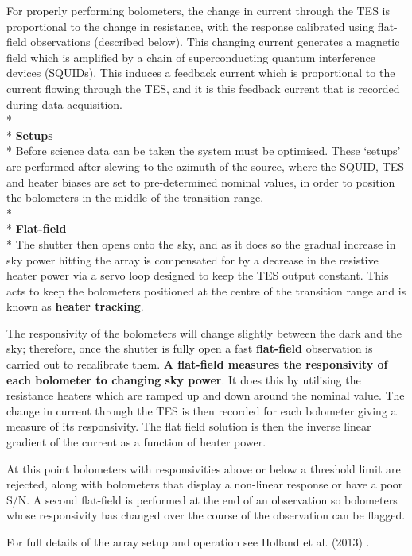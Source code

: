 \documentclass[twoside,11pt]{article}
\renewcommand{\_}{\texttt{\symbol{95}}}
\begin{document}
For properly performing bolometers, the change in current through the
TES is proportional to the change in resistance, with the response
calibrated using flat-field observations (described below). This
changing current generates a magnetic field which is amplified by a
chain of superconducting quantum interference devices (SQUIDs). This
induces a feedback current which is proportional to the current
flowing through the TES, and it is this feedback current that is
recorded during data acquisition.
\\*\\*
\textbf{Setups}\\*
Before science data can be taken the system must be optimised. These
`setups' are performed after slewing to the azimuth of the source,
where the SQUID, TES and heater biases are set to pre-determined
nominal values, in order to position the bolometers in the middle of
the transition range.
\\*\\*
\textbf{Flat-field}\\*
 The shutter then opens onto the sky, and
as it does so the gradual increase in sky power hitting the array is
compensated for by a decrease in the resistive heater power via a
servo loop designed to keep the TES output constant. This acts to keep
the bolometers positioned at the centre of the transition range and is
known as \textbf{heater tracking}.

The responsivity of the bolometers will change slightly between the
dark and the sky; therefore, once the shutter is fully open a fast
\textbf{flat-field} observation is carried out to recalibrate them.
\textbf{A flat-field measures the responsivity of each bolometer to
changing sky power}. It does this by utilising the resistance heaters
which are ramped up and down around the nominal value. The change in
current through the TES is then recorded for each bolometer giving a
measure of its responsivity. The flat field solution is then the
inverse linear gradient of the current as a function of heater power.

At this point bolometers with responsivities above or below a
threshold limit are rejected, along with bolometers that display a
non-linear response or have a poor S/N. A second flat-field is
performed at the end of an observation so bolometers whose
responsivity has changed over the course of the observation can be
flagged.

For full details of the array setup and operation see Holland et al.
(2013) \cite{s2main}.
\end{document}
